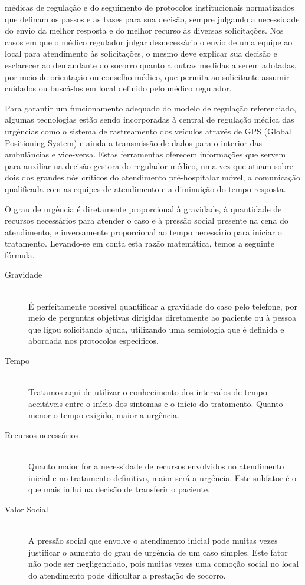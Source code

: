 médicas de regulação e do seguimento de protocolos institucionais normatizados que definam os passos e as bases para sua decisão, sempre julgando a necessidade do envio da melhor resposta e do melhor recurso às diversas solicitações. Nos casos em que o médico regulador julgar desnecessário o envio de uma equipe ao local para atendimento às solicitações, o mesmo deve explicar sua decisão e esclarecer ao demandante do socorro quanto a outras medidas a serem adotadas, por meio de orientação ou conselho médico, que permita ao solicitante assumir cuidados ou buscá-los em local definido pelo médico regulador.

Para garantir um funcionamento adequado do modelo de regulação referenciado, algumas tecnologias estão sendo incorporadas à central de regulação médica das urgências como o sistema de rastreamento dos veículos através de GPS (Global Positioning System) e ainda a transmissão de dados para o interior das ambulâncias e vice-versa.
Estas ferramentas oferecem informações que servem para auxiliar na decisão gestora do regulador médico, uma vez que atuam sobre dois dos grandes nós críticos do atendimento pré-hospitalar móvel, a comunicação qualificada com as equipes de atendimento e a diminuição do tempo resposta.


O grau de urgência é diretamente proporcional à gravidade, à quantidade de recursos necessários para atender o caso e à pressão social presente na cena do atendimento, e inversamente proporcional ao tempo necessário para iniciar o tratamento. Levando-se em conta esta razão matemática, temos a seguinte fórmula.


\begin{description}
  \item[Gravidade] \hfill \\
  É perfeitamente possível quantiﬁcar a gravidade do caso pelo telefone, por meio de perguntas objetivas dirigidas diretamente ao paciente ou à pessoa que ligou solicitando ajuda, utilizando uma semiologia que é deﬁnida e abordada nos protocolos especíﬁcos.
 \item[Tempo] \hfill \\
 Tratamos aqui de utilizar o conhecimento dos intervalos de tempo aceitáveis entre o início dos sintomas e o início do tratamento. Quanto menor o tempo exigido, maior a urgência.
 \item[Recursos necessários] \hfill \\
 Quanto maior for a necessidade de recursos envolvidos no atendimento inicial e no tratamento definitivo, maior será a urgência. Este subfator é o que mais influi na decisão de transferir o paciente.
  \item[Valor Social] \hfill \\
 A pressão social que envolve o atendimento inicial pode muitas vezes justiﬁcar o aumento do grau de urgência de um caso simples. Este fator não pode ser negligenciado, pois muitas vezes uma comoção social no local do atendimento pode diﬁcultar a prestação de socorro.
\end{description}

